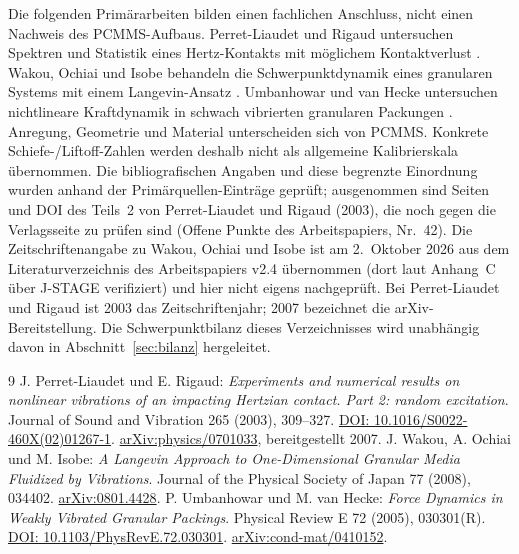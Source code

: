 \documentclass[11pt,a4paper]{article}
\begin{document}
Die folgenden Primärarbeiten bilden einen fachlichen Anschluss, nicht einen Nachweis des PCMMS-Aufbaus. Perret-Liaudet und Rigaud untersuchen Spektren und Statistik eines Hertz-Kontakts mit möglichem Kontaktverlust \cite{perret}. Wakou, Ochiai und Isobe behandeln die Schwerpunktdynamik eines granularen Systems mit einem Langevin-Ansatz \cite{wakou}. Umbanhowar und van Hecke untersuchen nichtlineare Kraftdynamik in schwach vibrierten granularen Packungen \cite{umbanhowar}. Anregung, Geometrie und Material unterscheiden sich von PCMMS. Konkrete Schiefe-/Liftoff-Zahlen werden deshalb nicht als allgemeine Kalibrierskala übernommen.
Die bibliografischen Angaben und diese begrenzte Einordnung wurden anhand der Primärquellen-Einträge geprüft; ausgenommen sind Seiten und DOI des Teils~2 von Perret-Liaudet und Rigaud (2003), die noch gegen die Verlagsseite zu prüfen sind (Offene Punkte des Arbeitspapiers, Nr.~42). Die Zeitschriftenangabe zu Wakou, Ochiai und Isobe ist am 2.~Oktober 2026 aus dem Literaturverzeichnis des Arbeitspapiers v2.4 übernommen (dort laut Anhang~C über J-STAGE verifiziert) und hier nicht eigens nachgeprüft. Bei Perret-Liaudet und Rigaud ist 2003 das Zeitschriftenjahr; 2007 bezeichnet die arXiv-Bereitstellung. Die Schwerpunktbilanz dieses Verzeichnisses wird unabhängig davon in Abschnitt~\ref{sec:bilanz} hergeleitet.
\begin{thebibliography}{9}
 J. Perret-Liaudet und E. Rigaud: \emph{Experiments and numerical results on nonlinear vibrations of an impacting Hertzian contact. Part 2: random excitation}. Journal of Sound and Vibration 265 (2003), 309--327. \href{https://doi.org/10.1016/S0022-460X(02)01267-1}{DOI: 10.1016/S0022-460X(02)01267-1}. \href{https://arxiv.org/abs/physics/0701033}{arXiv:physics/0701033}, bereitgestellt 2007.
 J. Wakou, A. Ochiai und M. Isobe: \emph{A Langevin Approach to One-Dimensional Granular Media Fluidized by Vibrations}. Journal of the Physical Society of Japan 77 (2008), 034402. \href{https://arxiv.org/abs/0801.4428}{arXiv:0801.4428}.
 P. Umbanhowar und M. van Hecke: \emph{Force Dynamics in Weakly Vibrated Granular Packings}. Physical Review E 72 (2005), 030301(R). \href{https://doi.org/10.1103/PhysRevE.72.030301}{DOI: 10.1103/PhysRevE.72.030301}. \href{https://arxiv.org/abs/cond-mat/0410152}{arXiv:cond-mat/0410152}.
\end{thebibliography}
\end{document}
